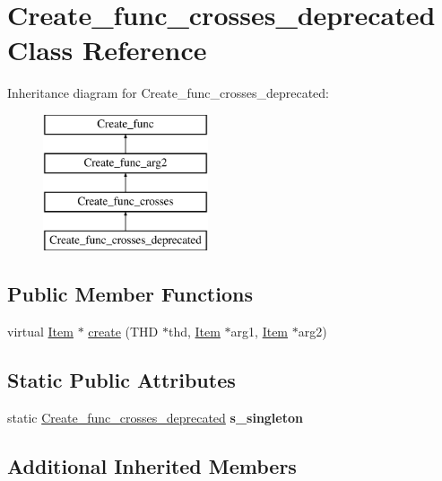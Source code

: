 \hypertarget{classCreate__func__crosses__deprecated}{}\section{Create\+\_\+func\+\_\+crosses\+\_\+deprecated Class Reference}
\label{classCreate__func__crosses__deprecated}
Inheritance diagram for Create\+\_\+func\+\_\+crosses\+\_\+deprecated\+:\begin{figure}[H]
\begin{center}
\leavevmode
\includegraphics[height=4.000000cm]{classCreate__func__crosses__deprecated}
\end{center}
\end{figure}
\subsection*{Public Member Functions}
\begin{DoxyCompactItemize}
\item 
virtual \mbox{\hyperlink{classItem}{Item}} $\ast$ \mbox{\hyperlink{classCreate__func__crosses__deprecated_a8b25bef9fe289b89661b54d116c98adf}{create}} (T\+HD $\ast$thd, \mbox{\hyperlink{classItem}{Item}} $\ast$arg1, \mbox{\hyperlink{classItem}{Item}} $\ast$arg2)
\end{DoxyCompactItemize}
\subsection*{Static Public Attributes}
\begin{DoxyCompactItemize}
\item 
\mbox{\label{classCreate__func__crosses__deprecated_a68d5f60554fef6dae8d0838700b4a884}} 
static \mbox{\hyperlink{classCreate__func__crosses__deprecated}{Create\+\_\+func\+\_\+crosses\+\_\+deprecated}} {\bfseries s\+\_\+singleton}
\end{DoxyCompactItemize}
\subsection*{Additional Inherited Members}


